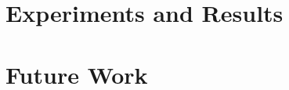 \documentclass[a4paper,11pt]{article}
\begin{document}
\section{ \textbf{Experiments and Results} }


\vfill


\section{ \textbf{Future Work} }


\vfill


\nocite{*} %
\end{document}
